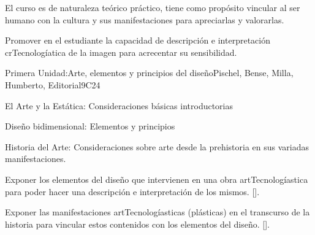 \begin{syllabus}


\begin{justification}
El curso es de naturaleza teórico práctico, tiene como propósito vincular al ser humano con la cultura y sus manifestaciones para apreciarlas y valorarlas.
\end{justification}

\begin{goals}
\item Promover en el estudiante la capacidad de descripción e interpretación crTecnologíatica de la imagen para acrecentar su sensibilidad.
\end{goals}

\begin{outcomes}
    \item {}
\end{outcomes}
\begin{competences}
    \item {}
\end{competences}

\begin{unit}{}{Primera Unidad:Arte, elementos y principios del diseño}{Pischel, Bense, Milla, Humberto, Editorial}{9}{C24}
\begin{topics}
	\item El Arte y la Estática: Consideraciones básicas introductorias
	\item Diseño bidimensional: Elementos y principios
	\item Historia del Arte: Consideraciones sobre arte desde la  prehistoria en sus variadas manifestaciones.
\end{topics}
\begin{learningoutcomes}
	\item Exponer los elementos del diseño que intervienen en una obra artTecnologíastica para poder hacer una descripción e interpretación de los mismos. [\Usage].
	\item Exponer las manifestaciones artTecnologíasticas (plásticas) en el transcurso de la historia para vincular estos contenidos con los elementos del diseño. [\Usage].

\end{learningoutcomes}
\end{unit}


\end{syllabus}
